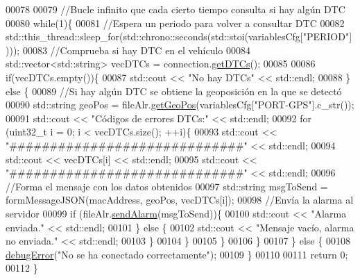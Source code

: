 \begin{DoxyCode}
00078 
00079         \textcolor{comment}{//Bucle infinito que cada cierto tiempo consulta si hay algún DTC}
00080         \textcolor{keywordflow}{while}(1)\{
00081             \textcolor{comment}{//Espera un periodo para volver a consultar DTC}
00082             std::this\_thread::sleep\_for(std::chrono::seconds(std::stoi(variablesCfg[\textcolor{stringliteral}{"PERIOD"}])));
00083             \textcolor{comment}{//Comprueba si hay DTC en el vehículo}
00084             std::vector<std::string> vecDTCs = connection.\hyperlink{classObd_ac57afb9228d933c6be5b2fa8e6446036}{getDTCs}();
00085 
00086             \textcolor{keywordflow}{if}(vecDTCs.empty())\{
00087                 std::cout << \textcolor{stringliteral}{"No hay DTCs"} << std::endl;
00088             \} \textcolor{keywordflow}{else} \{
00089                 \textcolor{comment}{//Si hay algún DTC se obtiene la geoposición en la que se detectó}
00090                 std::string geoPos = fileAlr.\hyperlink{classAlarmFile_a4865f7e404e938960e45b7e805956401}{getGeoPos}(variablesCfg[\textcolor{stringliteral}{"PORT-GPS"}].c\_str());
00091                 std::cout << \textcolor{stringliteral}{"Códigos de errores DTCs:"} << std::endl;
00092                 \textcolor{keywordflow}{for} (uint32\_t i = 0; i < vecDTCs.size(); ++i)\{
00093                     std::cout <<  \textcolor{stringliteral}{"#############################"} << std::endl;
00094                     std::cout <<  vecDTCs[i] << std::endl;
00095                     std::cout <<  \textcolor{stringliteral}{"#############################"} << std::endl;
00096                     \textcolor{comment}{//Forma el mensaje con los datos obtenidos}
00097                     std::string msgToSend = formMessageJSON(macAddress, geoPos, vecDTCs[i]);
00098                     \textcolor{comment}{//Envía la alarma al servidor}
00099                     \textcolor{keywordflow}{if} (fileAlr.\hyperlink{classAlarmFile_a37fd701cca3c3458a3009b508383947b}{sendAlarm}(msgToSend))\{
00100                         std::cout << \textcolor{stringliteral}{"Alarma enviada."} << std::endl;
00101                     \} \textcolor{keywordflow}{else} \{
00102                         std::cout << \textcolor{stringliteral}{"Mensaje vacío, alarma no enviada."} << std::endl;
00103                     \}                   
00104                 \}
00105             \}
00106         \}
00107     \} \textcolor{keywordflow}{else} \{
00108         \hyperlink{debug_8hpp_a06cd512b8b15b6da31a5a557445f7027}{debugError}(\textcolor{stringliteral}{"No se ha conectado correctamente"});
00109     \}
00110 
00111     \textcolor{keywordflow}{return} 0;
00112 \}
\end{DoxyCode}

